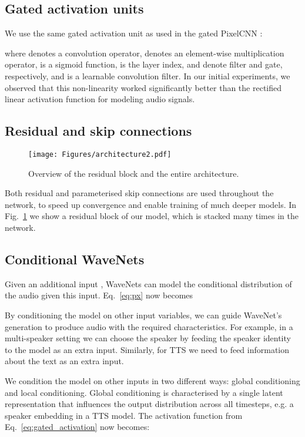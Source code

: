 \documentclass{article}
\makeatletter
\newcommand{\figref}[1]{Fig.~\ref{#1}}
\newcommand{\eqnref}[1]{Eq.~\eqref{#1}}
\newcommand*{\eg}{e.g.\@\xspace}
\makeatother
\begin{document}
\subsection{Gated activation units}

We use the same gated activation unit as used in the gated PixelCNN \citep{ConditionalPixelCNN}:

where  denotes a convolution operator,  denotes an element-wise multiplication operator,  is a sigmoid function,  is the layer index,  and  denote filter and gate, respectively, and  is a learnable convolution filter.
In our initial experiments, we observed that this non-linearity worked significantly better than the rectified linear activation function \citep{nair2010rectified} for modeling audio signals.

\subsection{Residual and skip connections}

\begin{figure}[h]
\centering
\texttt{[image: Figures/architecture2.pdf]}
\caption{Overview of the residual block and the entire architecture.}
\label{fig:architecture}
\end{figure}

Both residual \citep{he15deep} and parameterised skip connections are used throughout the network, to speed up convergence and enable training of much deeper models. In \figref{fig:architecture} we show a residual block of our model, which is stacked many times in the network.

\subsection{Conditional WaveNets}

Given an additional input , WaveNets can model the conditional distribution  of the audio given this input. \eqnref{eq:px} now becomes


By conditioning the model on other input variables, we can guide WaveNet's generation to produce audio with the required characteristics. For example, in a multi-speaker setting we can choose the speaker by feeding the speaker identity to the model as an extra input. Similarly, for TTS we need to feed information about the text as an extra input.

We condition the model on other inputs in two different ways: global conditioning and local conditioning. Global conditioning is characterised by a single latent representation  that influences the output distribution across all timesteps, \eg a speaker embedding in a TTS model. The activation function from \eqnref{eq:gated_activation} now becomes:
\end{document}
